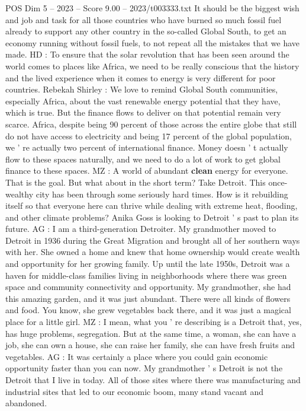 \begin{textsample}{POS Dim 5 – 2023 – Score 9.00 – 2023/t003333.txt}
It should be the biggest wish and job and task for all those countries who have burned so much fossil fuel already to support any other country in the so-called Global South, to get an economy running without fossil fuels, to not repeat all the mistakes that we have made.
HD : To ensure that the solar revolution that has been seen around the world comes to places like Africa, we need to be really conscious that the history and the lived experience when it comes to energy is very different for poor countries.
Rebekah Shirley : We love to remind Global South communities, especially Africa, about the vast renewable energy potential that they have, which is true.
But the finance flows to deliver on that potential remain very scarce.
Africa, despite being 90 percent of those across the entire globe that still do not have access to electricity and being 17 percent of the global population, we ' re actually two percent of international finance.
Money doesn ' t actually flow to these spaces naturally, and we need to do a lot of work to get global finance to these spaces.
MZ : A world of abundant \textbf{clean} energy for everyone.
That is the goal.
But what about in the short term?
Take Detroit.
This once-wealthy city has been through some seriously hard times.
How is it rebuilding itself so that everyone here can thrive while dealing with extreme heat, flooding, and other climate problems?
Anika Goss is looking to Detroit ' s past to plan its future.
AG : I am a third-generation Detroiter.
My grandmother moved to Detroit in 1936 during the Great Migration and brought all of her southern ways with her.
She owned a home and knew that home ownership would create wealth and opportunity for her growing family.
Up until the late 1950s, Detroit was a haven for middle-class families living in neighborhoods where there was green space and community connectivity and opportunity.
My grandmother, she had this amazing garden, and it was just abundant.
There were all kinds of flowers and food.
You know, she grew vegetables back there, and it was just a magical place for a little girl.
MZ : I mean, what you ' re describing is a Detroit that, yes, has huge problems, segregation.
But at the same time, a woman, she can have a job, she can own a house, she can raise her family, she can have fresh fruits and vegetables.
AG : It was certainly a place where you could gain economic opportunity faster than you can now.
My grandmother ' s Detroit is not the Detroit that I live in today.
All of those sites where there was manufacturing and industrial sites that led to our economic boom, many stand vacant and abandoned.

\end{textsample}
